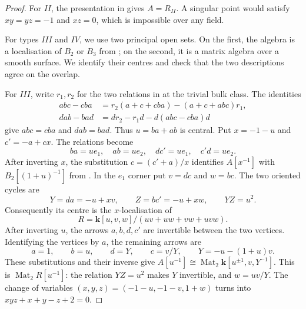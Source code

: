 \documentclass[a4paper]{amsart}
\newcommand{\kk}{\mathbf{k}}
\numberwithin{equation}{section}
\begin{document}
\begin{proof}
For $II$, the presentation in  gives
$A=R_{II}$. A singular point would satisfy $xy=yz=-1$ and $xz=0$,
which is impossible over any field.

For types $III$ and $IV$, we use two principal open sets. On the
first, the algebra is a localisation of $B_2$ or $B_3$ from
; on the second, it is a matrix
algebra over a smooth surface. We identify their centres and
check that the two descriptions agree on the overlap.

For $III$, write $r_1,r_2$ for the two relations in
 at the trivial bulk class. The identities
\[
\begin{aligned}
 abc-cba&=r_2(a+c+cba)-(a+c+abc)r_1,\\
 dab-bad&=dr_2-r_1d-d(abc-cba)d
\end{aligned}
\]
give $abc=cba$ and $dab=bad$.
Thus $u=ba+ab$ is central. Put $x=-1-u$ and $c'=-a+cx$.
The relations become
\[
 ba=u e_1,\quad ab=u e_2,\quad dc'=u e_1,\quad c'd=u e_2.
\]
After inverting $x$, the substitution $c=(c'+a)/x$ identifies
$A[x^{-1}]$ with $B_2[(1+u)^{-1}]$ from
. In the $e_1$ corner put
$v=dc$ and $w=bc$. The two oriented cycles are
\[
 Y=da=-u+xv,\qquad Z=bc'=-u+xw,\qquad YZ=u^2.
\]
Consequently its centre is the $x$-localisation of
\begin{equation}\label{eq:III-centre-chart}
 R=\kk[u,v,w]/(uv+uw+vw+uvw).
\end{equation}
After inverting $u$, the arrows $a,b,d,c'$ are invertible between
the two vertices. Identifying the vertices by $a$, the remaining
arrows are
\[
 a=1,\qquad b=u,\qquad d=Y,\qquad c=v/Y,
 \qquad Y=-u-(1+u)v.
\]
These substitutions and their inverse give
$A[u^{-1}]\cong\operatorname{Mat}_2
\kk[u^{\pm1},v,Y^{-1}]$. This is $\operatorname{Mat}_2R[u^{-1}]$:
the relation $YZ=u^2$ makes $Y$ invertible, and $w=uv/Y$.
The change of variables $(x,y,z)=(-1-u,-1-v,1+w)$ turns
 into $xyz+x+y-z+2=0$.


\end{proof}
\end{document}
